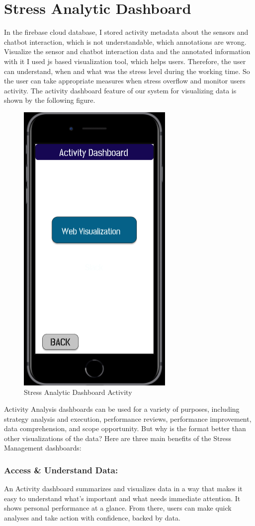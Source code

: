 \section{Stress Analytic Dashboard}
In the firebase cloud database, I stored activity metadata about the sensors and chatbot interaction, which is not understandable, which annotations are wrong. Visualize the sensor and chatbot interaction data and the annotated information with it I used \acf{js} based visualization tool, which helps users. Therefore, the user can understand, when and what was the stress level during the working time. So the user can take appropriate measures when stress overflow and monitor users activity. The activity dashboard feature of our system for visualizing data is shown by the following figure.
\begin{figure}[hbt!] 
  \centering
  \includegraphics[width=0.4\linewidth]{chap4/image4/dashboard.png}
  \caption[Stress Analytics Dashboard Activity ]{Stress Analytic Dashboard Activity}
  \label{fig:dashboard}
\end{figure}
Activity Analysis dashboards can be used for a variety of purposes, including strategy analysis and execution, performance reviews, performance improvement, data comprehension, and scope opportunity. But why is the format better than other visualizations of the data? Here are three main benefits of the Stress Management dashboards:
\subsubsection*{Access \& Understand Data:}
An Activity dashboard summarizes and visualizes data in a way that makes it easy to understand what’s important and what needs immediate attention. It shows personal performance at a glance. From there, users can make quick analyses and take action with confidence, backed by data. 
